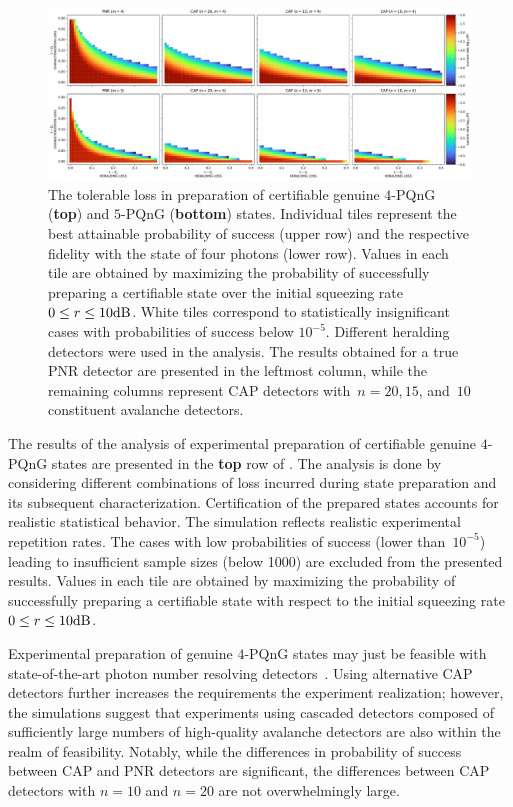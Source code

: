 \documentclass{article}
\begin{document}
\begin{figure}[h]
  \bgroup
    \hspace*{-0.125\columnwidth}%
    \includegraphics[width = 1.25 \columnwidth]{import/202504/paper_unified_merged_51-10dB.pdf}
  \egroup
  \caption{
    The tolerable loss in preparation of certifiable genuine $4$-PQnG (\textbf{top}) and $5$-PQnG (\textbf{bottom}) states. Individual tiles represent the best attainable probability of success (upper row) and the respective fidelity with the state of four photons (lower row). Values in each tile are obtained by maximizing the probability of successfully preparing a certifiable state over the initial squeezing rate~${0 \leq r \leq 10\mathrm{dB}}$. White tiles correspond to statistically insignificant cases with probabilities of success below $10^{-5}$. Different heralding detectors were used in the analysis. The results obtained for a true PNR detector are presented in the leftmost column, while the remaining columns represent CAP detectors with~${n = 20, 15}$, and~$10$ constituent avalanche detectors.
  }
  \label{f-res-45}
\end{figure}

The results of the analysis of experimental preparation of certifiable genuine $4$-PQnG states are presented in the \textbf{top} row of . The analysis is done by considering different combinations of loss incurred during state preparation and its subsequent characterization. Certification of the prepared states accounts for realistic statistical behavior. The simulation reflects realistic experimental repetition rates. The cases with low probabilities of success (lower than~$10^{-5}$) leading to insufficient sample sizes (below 1000) are excluded from the presented results. Values in each tile are obtained by maximizing the probability of successfully preparing a certifiable state with respect to the initial squeezing rate~${0 \leq r \leq 10\mathrm{dB}}$.

Experimental preparation of genuine $4$-PQnG states may just be feasible with state-of-the-art photon number resolving detectors~\cite{endo2021,endo2024}. Using alternative CAP detectors further increases the requirements  the experiment realization; however, the simulations suggest that experiments using cascaded detectors composed of sufficiently large numbers of high-quality avalanche detectors are also within the realm of feasibility. Notably, while the differences in probability of success between CAP and PNR detectors are significant, the differences between CAP detectors with $n = 10$ and $n = 20$ are not overwhelmingly large.
\end{document}

